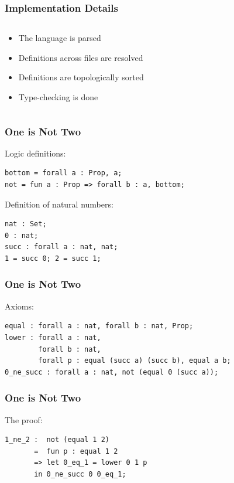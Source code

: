 \documentclass[aspectratio=169]{beamer}
\begin{document}
    	\begin{frame}
    		\frametitle{Implementation Details} 
			\begin{columns}[c]
    		\begin{column}{0.40 \textwidth}
           	\begin{itemize}
           		\item<2-> The language is parsed 
           		\item<3-> Definitions across files are resolved
           		\item<4-> Definitions are topologically sorted
           		\item<5-> Type-checking is done
           	\end{itemize}
           \end{column} 
       \begin{column}{0.60 \textwidth}
       	\centering
       		
       	\end{column}
       \end{columns}
 
    	\end{frame}    	
    	\begin{frame}[fragile]
    		\frametitle{One is Not Two}
    		Logic definitions: 
    			\begin{verbatim}
bottom = forall a : Prop, a; 
not = fun a : Prop => forall b : a, bottom;
    		\end{verbatim}
    	\pause
    		Definition of natural numbers: 
    \begin{verbatim}
nat : Set; 
0 : nat; 
succ : forall a : nat, nat; 
1 = succ 0; 2 = succ 1; 
    \end{verbatim}
\end{frame}

    	\begin{frame}[fragile]
    		\frametitle{One is Not Two}
    		Axioms: 
    			\begin{verbatim}
equal : forall a : nat, forall b : nat, Prop; 
lower : forall a : nat, 
        forall b : nat, 
        forall p : equal (succ a) (succ b), equal a b;
0_ne_succ : forall a : nat, not (equal 0 (succ a));  
    		\end{verbatim}
\end{frame}

    	\begin{frame}[fragile]
    		\frametitle{One is Not Two}
    		The proof: 
    			\begin{verbatim}
1_ne_2 :  not (equal 1 2)
       =  fun p : equal 1 2 
       => let 0_eq_1 = lower 0 1 p 
       in 0_ne_succ 0 0_eq_1; 
    		\end{verbatim}
\end{frame}
\end{document}

